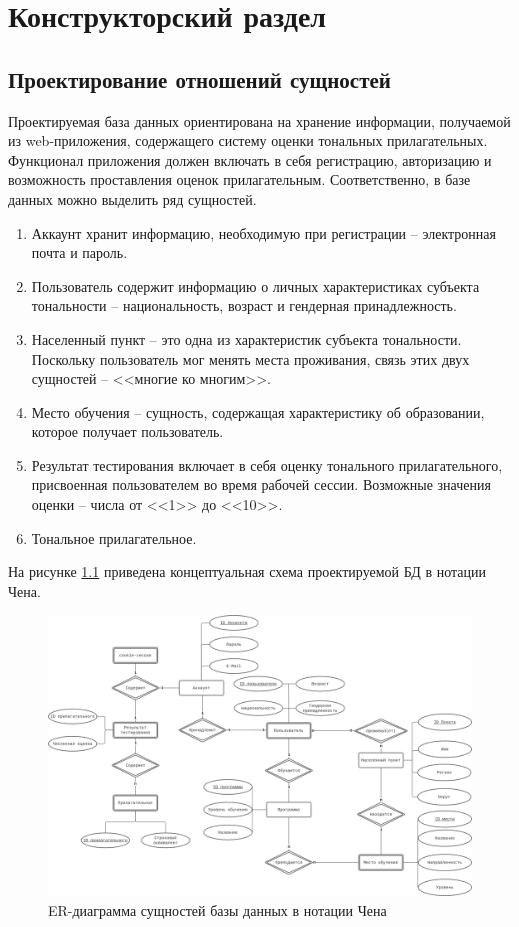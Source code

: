 \chapter{Конструкторский раздел}\label{sec:design}
\section{\protect\justifying\protect\RaggedRight Проектирование отношений сущностей}
Проектируемая база данных ориентирована на хранение информации, получаемой из web-приложения, содержащего систему оценки тональных прилагательных. Функционал приложения должен включать в себя регистрацию, авторизацию и возможность проставления оценок прилагательным. Соответственно, в базе данных можно выделить ряд сущностей. 
\begin{enumerate}
	\item Аккаунт хранит информацию, необходимую при регистрации -- электронная почта и пароль.
	\item Пользователь содержит информацию о личных характеристиках субъекта тональности -- национальность, возраст и гендерная принадлежность. 
	\item Населенный пункт -- это одна из характеристик субъекта тональности. Поскольку пользователь мог менять места проживания, связь этих двух сущностей -- <<многие ко многим>>.
	\item Место обучения -- сущность, содержащая характеристику об образовании, которое получает пользователь.
	\item Результат тестирования включает в себя оценку тонального прилагательного, присвоенная пользователем во время рабочей сессии. Возможные значения оценки -- числа от <<1>> до <<10>>.
	\item Тональное прилагательное.
\end{enumerate}
На рисунке \ref{fig:chen} приведена концептуальная схема проектируемой БД в нотации Чена. 
\begin{center}
	\begin{figure}[H]
		\centering
		\includegraphics[width=\linewidth]{assets/term-chen.drawio.png}
		\caption{ER-диаграмма сущностей базы данных в нотации Чена}
		\label{fig:chen}
	\end{figure}
\end{center} 
